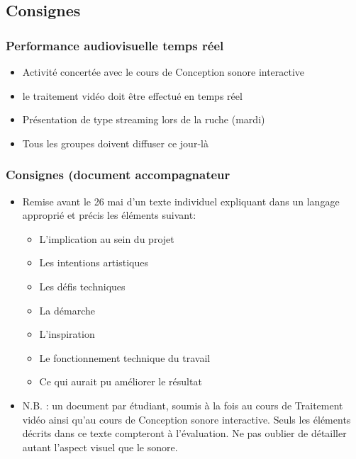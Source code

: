 \documentclass[
]{book}
\providecommand{\tightlist}{%
  \setlength{\itemsep}{0pt}\setlength{\parskip}{0pt}}
\begin{document}
\hypertarget{consignes-4}{%
\subsection{Consignes}\label{consignes-4}}

\hypertarget{performance-audiovisuelle-temps-ruxe9el}{%
\subsubsection{Performance audiovisuelle temps réel}\label{performance-audiovisuelle-temps-ruxe9el}}

\begin{itemize}
\tightlist
\item
  Activité concertée avec le cours de Conception sonore interactive
\item
  le traitement vidéo doit être effectué en temps réel
\item
  Présentation de type streaming lors de la ruche (mardi)
\item
  Tous les groupes doivent diffuser ce jour-là
\end{itemize}

\hypertarget{consignes-document-accompagnateur}{%
\subsubsection{Consignes (document accompagnateur}\label{consignes-document-accompagnateur}}

\begin{itemize}
\tightlist
\item
  Remise avant le 26 mai d'un texte individuel expliquant dans un langage approprié et précis les éléments suivant:

  \begin{itemize}
  \tightlist
  \item
    L'implication au sein du projet
  \item
    Les intentions artistiques
  \item
    Les défis techniques
  \item
    La démarche
  \item
    L'inspiration
  \item
    Le fonctionnement technique du travail
  \item
    Ce qui aurait pu améliorer le résultat
  \end{itemize}
\item
  N.B. : un document par étudiant, soumis à la fois au cours de Traitement vidéo ainsi qu'au cours de Conception sonore interactive. Seuls les éléments décrits dans ce texte compteront à l'évaluation. Ne pas oublier de détailler autant l'aspect visuel que le sonore.
\end{itemize}
\end{document}
